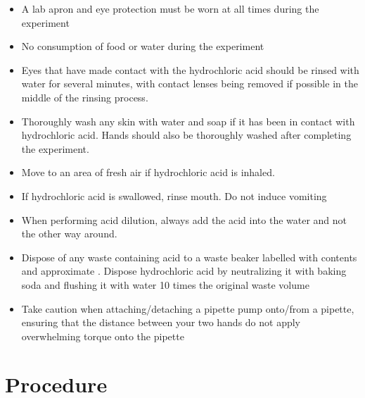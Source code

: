 \documentclass[11pt, letterpaper]{article}
\begin{document}
\begin{paracol}{2}
    \begin{itemize}
        \item A lab apron and eye protection must be worn at all times during the experiment
        \item No consumption of food or water during the experiment
        \item Eyes that have made contact with the hydrochloric acid should be rinsed with water for several minutes, with contact lenses being removed if possible in the middle of the rinsing process.
        \item Thoroughly wash any skin with water and soap if it has been in contact with hydrochloric acid. Hands should also be thoroughly washed after completing the experiment.
        \item Move to an area of fresh air if hydrochloric acid is inhaled.
    \end{itemize}
    \switchcolumn
    \begin{itemize}
        \item If hydrochloric acid is swallowed, rinse mouth. Do not induce vomiting
        \item When performing acid dilution, always add the acid into the water and not the other way around.
        \item Dispose of any waste containing acid to a waste beaker labelled with contents and approximate \ce{[H+]}. Dispose hydrochloric acid by neutralizing it with baking soda and flushing it with water 10 times the original waste volume
        \item Take caution when attaching/detaching a pipette pump onto/from a pipette, ensuring that the distance between your two hands do not apply overwhelming torque onto the pipette
    \end{itemize}
\end{paracol}

\section{Procedure}
\end{document}
